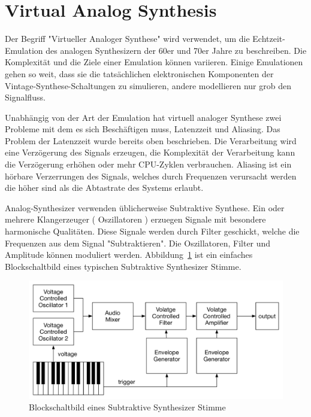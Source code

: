\section{Virtual Analog Synthesis}

Der Begriff "Virtueller Analoger Synthese" wird verwendet, um die Echtzeit-Emulation des analogen Synthesizern der 60er und 70er Jahre zu beschreiben. Die Komplexität und die Ziele einer Emulation können variieren. Einige Emulationen gehen so weit, dass sie die tatsächlichen elektronischen Komponenten der Vintage-Synthese-Schaltungen zu simulieren, andere modellieren nur grob den Signalfluss.

Unabhängig von der Art der Emulation hat virtuell analoger Synthese zwei Probleme mit dem es sich Beschäftigen muss, Latenzzeit und Aliasing. Das Problem der Latenzzeit wurde bereits oben beschrieben. Die Verarbeitung wird eine Verzögerung des Signals erzeugen, die Komplexität der Verarbeitung kann die Verzögerung erhöhen oder mehr CPU-Zyklen verbrauchen. Aliasing ist ein hörbare Verzerrungen des Signals, welches durch Frequenzen verursacht werden die höher sind als die Abtastrate des Systems erlaubt.

Analog-Synthesizer verwenden üblicherweise Subtraktive Synthese. Ein oder mehrere Klangerzeuger ( Oszillatoren ) erzuegen Signale mit besondere harmonische Qualitäten. Diese Signale werden durch Filter geschickt, welche die Frequenzen aus dem Signal "Subtraktieren". Die Oszillatoren, Filter und Amplitude können moduliert werden. Abbildung~\ref{fig:synth_voice_block} ist ein einfaches Blockschaltbild eines typischen Subtraktive Synthesizer Stimme.

\begin{figure}[H]
    \centering
    \includegraphics[width=\textwidth]{assets/synth_voice_block.pdf}
    \caption{Blockschaltbild eines Subtraktive Synthesizer Stimme}
    \label{fig:synth_voice_block}
\end{figure}

